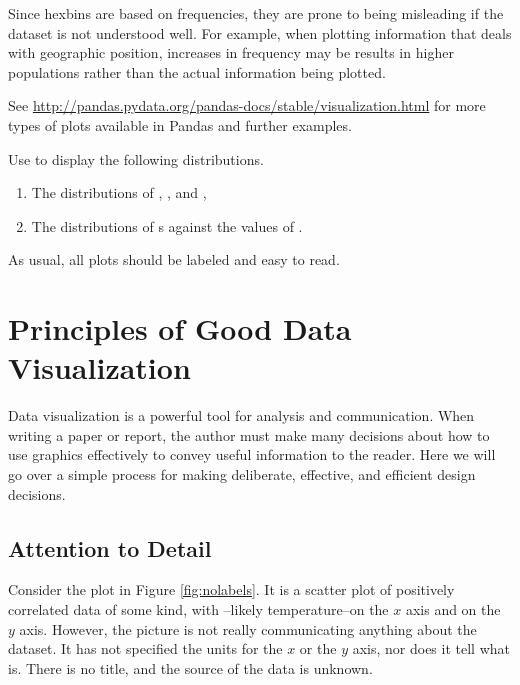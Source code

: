 \begin{info}
Since hexbins are based on frequencies, they are prone to being misleading if the dataset is not understood well. For example, when plotting information that deals with geographic position, increases in frequency may be results in higher populations rather than the actual information being plotted.

\end{info}

See \url{http://pandas.pydata.org/pandas-docs/stable/visualization.html} for more types of plots available in Pandas and further examples.

\begin{problem}
Use  to display the following distributions.
\begin{enumerate}
        \item The distributions of , , and ,
        \item The distributions of s against the values of .
\end{enumerate}

As usual, all plots should be labeled and easy to read.
\end{problem}

\section*{Principles of Good Data Visualization} %

Data visualization is a powerful tool for analysis and communication.
When writing a paper or report, the author must make many decisions about how to use graphics effectively to convey useful information to the reader.
Here we will go over a simple process for making deliberate, effective, and efficient design decisions.

\subsection*{Attention to Detail} %

Consider the plot in Figure \ref{fig:nolabels}.
It is a scatter plot of positively correlated data of some kind, with --likely temperature--on the $x$ axis and  on the $y$ axis.
However, the picture is not really communicating anything about the dataset.
It has not specified the units for the $x$ or the $y$ axis, nor does it tell what  is. 
There is no title, and the source of the data is unknown.

